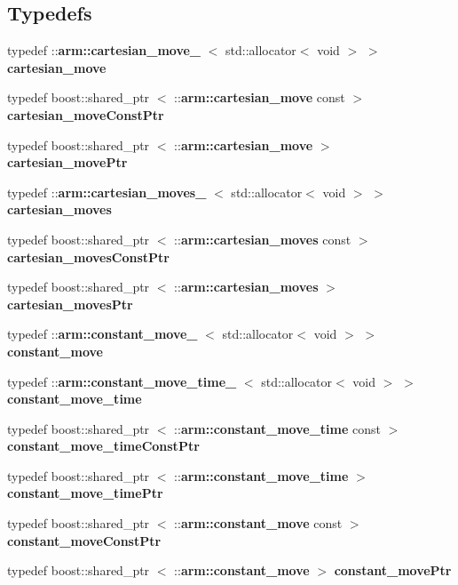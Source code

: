 \subsection*{\-Typedefs}
\begin{DoxyCompactItemize}
\item 
typedef \-::{\bf arm\-::cartesian\-\_\-move\-\_\-}\*
$<$ std\-::allocator$<$ void $>$ $>$ {\bf cartesian\-\_\-move}
\item 
typedef boost\-::shared\-\_\-ptr\*
$<$ \-::{\bf arm\-::cartesian\-\_\-move} const  $>$ {\bf cartesian\-\_\-move\-Const\-Ptr}
\item 
typedef boost\-::shared\-\_\-ptr\*
$<$ \-::{\bf arm\-::cartesian\-\_\-move} $>$ {\bf cartesian\-\_\-move\-Ptr}
\item 
typedef \*
\-::{\bf arm\-::cartesian\-\_\-moves\-\_\-}\*
$<$ std\-::allocator$<$ void $>$ $>$ {\bf cartesian\-\_\-moves}
\item 
typedef boost\-::shared\-\_\-ptr\*
$<$ \-::{\bf arm\-::cartesian\-\_\-moves} const  $>$ {\bf cartesian\-\_\-moves\-Const\-Ptr}
\item 
typedef boost\-::shared\-\_\-ptr\*
$<$ \-::{\bf arm\-::cartesian\-\_\-moves} $>$ {\bf cartesian\-\_\-moves\-Ptr}
\item 
typedef \-::{\bf arm\-::constant\-\_\-move\-\_\-}\*
$<$ std\-::allocator$<$ void $>$ $>$ {\bf constant\-\_\-move}
\item 
typedef \*
\-::{\bf arm\-::constant\-\_\-move\-\_\-time\-\_\-}\*
$<$ std\-::allocator$<$ void $>$ $>$ {\bf constant\-\_\-move\-\_\-time}
\item 
typedef boost\-::shared\-\_\-ptr\*
$<$ \-::{\bf arm\-::constant\-\_\-move\-\_\-time} \*
const  $>$ {\bf constant\-\_\-move\-\_\-time\-Const\-Ptr}
\item 
typedef boost\-::shared\-\_\-ptr\*
$<$ \-::{\bf arm\-::constant\-\_\-move\-\_\-time} $>$ {\bf constant\-\_\-move\-\_\-time\-Ptr}
\item 
typedef boost\-::shared\-\_\-ptr\*
$<$ \-::{\bf arm\-::constant\-\_\-move} const  $>$ {\bf constant\-\_\-move\-Const\-Ptr}
\item 
typedef boost\-::shared\-\_\-ptr\*
$<$ \-::{\bf arm\-::constant\-\_\-move} $>$ {\bf constant\-\_\-move\-Ptr}
\end{DoxyCompactItemize}
